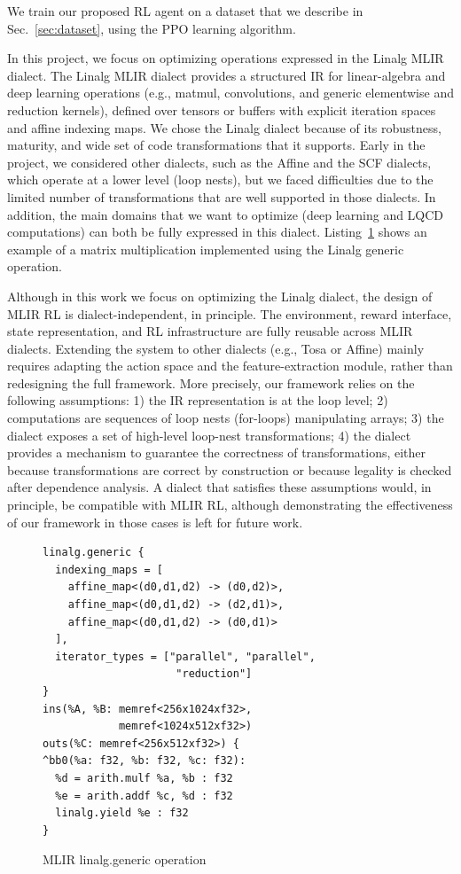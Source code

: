 \documentclass[10pt,twocolumn]{article}
\begin{document}
We train our proposed RL agent on a dataset that we describe in Sec.~\ref{sec:dataset}, using the PPO learning algorithm.

In this project, we focus on optimizing operations expressed in the Linalg MLIR dialect. The Linalg MLIR dialect provides a structured IR for linear-algebra and deep learning operations (e.g., matmul, convolutions, and generic elementwise and reduction kernels), defined over tensors or buffers with explicit iteration spaces and affine indexing maps. We chose the Linalg dialect because of its robustness, maturity, and wide set of code transformations that it supports. Early in the project, we considered other dialects, such as the Affine and the SCF dialects, which operate at a lower level (loop nests), but we faced difficulties due to the limited number of transformations that are well supported in those dialects. In addition, the main domains that we want to optimize (deep learning and LQCD computations) can both be fully expressed in this dialect. Listing~\ref{lst:matmul} shows an example of a matrix multiplication implemented using the Linalg generic operation.

Although in this work we focus on optimizing the Linalg dialect, the design of MLIR RL is dialect-independent, in principle. The environment, reward interface, state representation, and RL infrastructure are fully reusable across MLIR dialects. Extending the system to other dialects (e.g., Tosa or Affine) mainly requires adapting the action space and the feature-extraction module, rather than redesigning the full framework. More precisely, our framework relies on the following assumptions: 1) the IR representation is at the loop level; 2) computations are sequences of loop nests (for-loops) manipulating arrays; 3) the dialect exposes a set of high-level loop-nest transformations; 4) the dialect provides a mechanism to guarantee the correctness of transformations, either because transformations are correct by construction or because legality is checked after dependence analysis. A dialect that satisfies these assumptions would, in principle, be compatible with MLIR RL, although demonstrating the effectiveness of our framework in those cases is left for future work.

\begin{figure}[t]
\centering
\begin{verbatim}
linalg.generic {
  indexing_maps = [
    affine_map<(d0,d1,d2) -> (d0,d2)>,
    affine_map<(d0,d1,d2) -> (d2,d1)>,
    affine_map<(d0,d1,d2) -> (d0,d1)>
  ],
  iterator_types = ["parallel", "parallel",
                     "reduction"]
}
ins(%A, %B: memref<256x1024xf32>,
            memref<1024x512xf32>)
outs(%C: memref<256x512xf32>) {
^bb0(%a: f32, %b: f32, %c: f32):
  %d = arith.mulf %a, %b : f32
  %e = arith.addf %c, %d : f32
  linalg.yield %e : f32
}
\end{verbatim}
\caption{MLIR linalg.generic operation}
\label{lst:matmul}
\end{figure}
\end{document}
